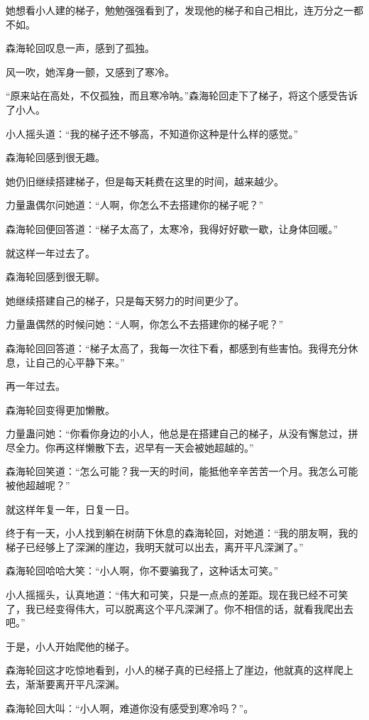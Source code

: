\begin{this_body}
她想看小人建的梯子，勉勉强强看到了，发现他的梯子和自己相比，连万分之一都不如。

森海轮回叹息一声，感到了孤独。

风一吹，她浑身一颤，又感到了寒冷。

“原来站在高处，不仅孤独，而且寒冷呐。”森海轮回走下了梯子，将这个感受告诉了小人。

小人摇头道：“我的梯子还不够高，不知道你这种是什么样的感觉。”

森海轮回感到很无趣。

她仍旧继续搭建梯子，但是每天耗费在这里的时间，越来越少。

力量蛊偶尔问她道：“人啊，你怎么不去搭建你的梯子呢？”

森海轮回便回答道：“梯子太高了，太寒冷，我得好好歇一歇，让身体回暖。”

就这样一年过去了。

森海轮回感到很无聊。

她继续搭建自己的梯子，只是每天努力的时间更少了。

力量蛊偶然的时候问她：“人啊，你怎么不去搭建你的梯子呢？”

森海轮回回答道：“梯子太高了，我每一次往下看，都感到有些害怕。我得充分休息，让自己的心平静下来。”

再一年过去。

森海轮回变得更加懒散。

力量蛊问她：“你看你身边的小人，他总是在搭建自己的梯子，从没有懈怠过，拼尽全力。你再这样懒散下去，迟早有一天会被她超越的。”

森海轮回笑道：“怎么可能？我一天的时间，能抵他辛辛苦苦一个月。我怎么可能被他超越呢？”

就这样年复一年，日复一日。

终于有一天，小人找到躺在树荫下休息的森海轮回，对她道：“我的朋友啊，我的梯子已经够上了深渊的崖边，我明天就可以出去，离开平凡深渊了。”

森海轮回哈哈大笑：“小人啊，你不要骗我了，这种话太可笑。”

小人摇摇头，认真地道：“伟大和可笑，只是一点点的差距。现在我已经不可笑了，我已经变得伟大，可以脱离这个平凡深渊了。你不相信的话，就看我爬出去吧。”

于是，小人开始爬他的梯子。

森海轮回这才吃惊地看到，小人的梯子真的已经搭上了崖边，他就真的这样爬上去，渐渐要离开平凡深渊。

森海轮回大叫：“小人啊，难道你没有感受到寒冷吗？”。


\end{this_body}

